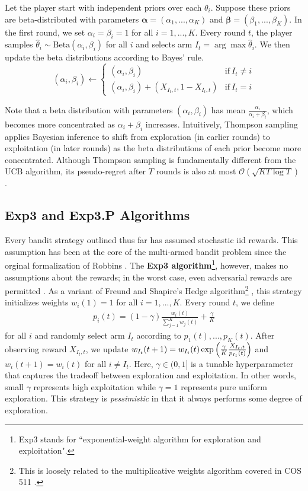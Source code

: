 \documentclass[12pt]{article}
\begin{document}
Let the player start with independent priors over each $\theta_{i}$. Suppose these priors are beta-distributed with parameters $\boldsymbol{\alpha}=(\alpha_{1}, ..., \alpha_{K})$ and $\boldsymbol{\beta}=(\beta_{1}, ..., \beta_{K})$. In the first round, we set $\alpha_{i}=\beta_{i}=1$ for all $i=1,...,K$. Every round $t$, the player samples $\hat{\theta}_{i}\sim\text{Beta}(\alpha_{i},\beta_{i})$ for all $i$ and selects arm $I_{t}=\arg\max\hat{\theta}_{i}$. We then update the beta distributions according to Bayes' rule.
\begin{equation}
(\alpha_{i}, \beta_{i})\leftarrow
\begin{cases}
(\alpha_{i},\beta_{i})&\text{if}\ I_{t}\neq i \\
(\alpha_{i},\beta_{i})+(X_{I_{t},t},1-X_{I_{t},t})&\text{if}\ I_{t}=i
\end{cases}
\end{equation}
 
Note that a beta distribution with parameters $(\alpha_{i},\beta_{i})$ has mean $\frac{\alpha_{i}}{\alpha_{i}+\beta_{i}}$, which becomes more concentrated as $\alpha_{i}+\beta_{i}$ increases. Intuitively, Thompson sampling applies Bayesian inference to shift from exploration (in earlier rounds) to exploitation (in later rounds) as the beta distributions of each prior become more concentrated. Although Thompson sampling is fundamentally different from the UCB algorithm, its pseudo-regret after $T$ rounds is also at most $\mathcal{O}(\sqrt{KT\log T})$ \cite{agrawal2012}.

\subsection{Exp3 and Exp3.P Algorithms}

Every bandit strategy outlined thus far has assumed stochastic iid rewards. This assumption has been at the core of the multi-armed bandit problem since the orginal formalization of Robbins \cite{robbins1952}. The \textbf{Exp3 algorithm}\footnote{Exp3 stands for ``exponential-weight algorithm for exploration and exploitation".}, however, makes no assumptions about the rewards; in the worst case, even adversarial rewards are permitted \cite{auer2003}. As a variant of Freund and Shapire's Hedge algorithm\footnote{This is loosely related to the multiplicative weights algorithm covered in COS 511 \cite{lecture16}.} \cite{freund1997}, this strategy initializes weights $w_{i}(1)=1$ for all $i=1,...,K$. Every round $t$, we define
\begin{align}
p_{i}(t)=(1-\gamma)\frac{w_{i}(t)}{\sum_{j=1}^{K}w_{j}(t)}+\frac{\gamma}{K}
\end{align}
for all $i$ and randomly select arm $I_{t}$ according to $p_{1}(t),...,p_{K}(t)$. After observing reward $X_{I_{t},t}$, we update $w_{I_{t}}(t+1)=w_{I_{t}}(t)\exp\Big{(}{\frac{\gamma}{K}\frac{X_{I_{t},t}}{p_{I_{t}}(t)}}\Big{)}$ and $w_{i}(t+1)=w_{i}(t)$ for all $i\neq I_{t}$. Here, $\gamma\in(0,1]$ is a tunable hyperparameter that captures the tradeoff between exploration and exploitation. In other words, small $\gamma$ represents high exploitation while $\gamma=1$ represents pure uniform exploration. This strategy is \textit{pessimistic} in that it always performs some degree of exploration.
\end{document}
